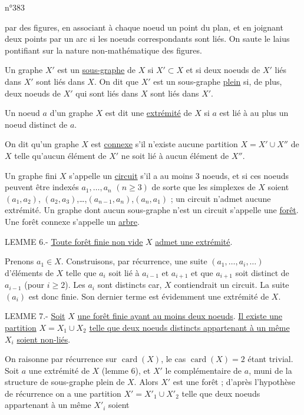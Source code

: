 \hfill n°383

par des figures, en associant à chaque noeud un point du plan, et en joignant deux points par un arc si les noeuds correspondants sont liés. On saute le laius pontifiant sur la nature non-mathématique des figures.

Un graphe $X'$ est un \uline{sous-graphe} de $X$ si $X'\subset X$ et si deux noeuds de $X'$ liés dans $X'$ sont liés dans $X$. On dit que $X'$ est un sous-graphe \uline{plein} si, de plus, deux noeuds de $X'$ qui sont liés dans $X$ sont liés dans $X'$.

Un noeud $a$ d'un graphe $X$ est dit une \uline{extrémité} de $X$ si $a$ est lié à au plus un noeud distinct de $a$.

On dit qu'un graphe $X$ est \uline{connexe} s'il n'existe aucune partition $X=X'\cup X''$ de $X$ telle qu'aucun élément de $X'$ ne soit lié à aucun élément de $X''$.

Un graphe fini $X$ s'appelle un \uline{circuit} s'il a au moins $3$ noeuds, et si ces noeuds peuvent être indexés $a_1,\ldots,a_n$ $(n\geqslant3)$ de sorte que les simplexes de $X$ soient $(a_1,a_2)$, $(a_2,a_3)$,\ldots,$(a_{n-1},a_n)$,$(a_n,a_1)$ ; un circuit n'admet aucune extrémité. Un graphe dont aucun sous-graphe n'est un circuit s'appelle une \uline{forêt}. Une forêt connexe s'appelle un \uline{arbre}.

LEMME 6.- \uline{Toute forêt finie non vide} $X$ \uline{admet une extrémité}.

Prenons $a_1\in X$. Construisons, par récurrence, une suite $(a_1,\ldots,a_i,\ldots)$ d'éléments de $X$ telle que $a_i$ soit lié à $a_{i-1}$ et $a_{i+1}$ et que $a_{i+1}$ soit distinct de $a_{i-1}$ (pour $i\geqslant2$). Les $a_i$ sont distincts car,  $X$ contiendrait un circuit. La suite $(a_i)$ est donc finie. Son dernier terme est évidemment une extrémité de $X$.

LEMME 7.- \uline{Soit} $X$ \uline{une forêt finie ayant au moins deux noeuds}. \uline{Il existe une partition} $X=X_1\cup X_2$ \uline{telle que deux noeuds distincts appartenant à un même} $X_i$ \uline{soient non-liés}.

On raisonne par récurrence sur $\operatorname{card}(X)$, le cas $\operatorname{card}(X)=2$ étant trivial. Soit $a$ une extrémité de $X$ (lemme 6), et $X'$ le complémentaire de $a$, muni de la structure de sous-graphe plein de $X$. Alors $X'$ est une forêt ; d'après l'hypothèse de récurrence on a une partition $X'=X'_1\cup X'_2$ telle que deux noeuds appartenant à un même $X'_i$ soient
